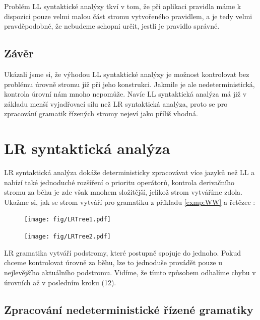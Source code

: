 Problém LL syntaktické analýzy tkví v tom, že při aplikaci pravidla máme k
dispozici pouze velmi malou část stromu vytvořeného pravidlem, a je tedy velmi
pravděpodobné, že nebudeme schopni určit, jestli je pravidlo správné.\\

\subsection*{Závěr}

Ukázali jsme si, že výhodou LL syntaktické analýzy je možnost kontrolovat
bez problému úrovně stromu již při jeho konstrukci.
Jakmile je ale  nedeterministická, kontrola úrovní
nám mnoho nepomůže.
Navíc LL syntaktická analýza má již v základu menší vyjadřovací sílu než
LR syntaktická analýza, proto se pro zpracování gramatik řízených stromy
nejeví jako příliš vhodná.

\section{LR syntaktická analýza}
\label{sec:LRTreeLevelCheck}

LR syntaktická analýza dokáže deterministicky zpracovávat více jazyků
než LL a nabízí také jednoduché rozšíření o prioritu operátorů,
kontrola derivačního stromu za běhu je zde však mnohem složitější,
jelikož strom vytváříme zdola. Ukažme si, jak se strom vytváří pro
gramatiku z příkladu \ref{exmp:WW} a řetězec :

\begin{figure}[H]
  \centering
  \texttt{[image: fig/LRTree1.pdf]}
\end{figure}

\begin{figure}[H]
  \centering
  \texttt{[image: fig/LRTree2.pdf]}
\end{figure}

LR gramatika vytváří podstromy, které postupně spojuje do jednoho.
Pokud chceme kontrolovat úrovně za běhu, lze to jednoduše provádět pouze
u nejlevějšího aktuálního podstromu.
Vidíme, že tímto způsobem odhalíme chybu v úrovních až v posledním kroku (12).\\

\subsection{Zpracování nedeterministické řízené gramatiky}

